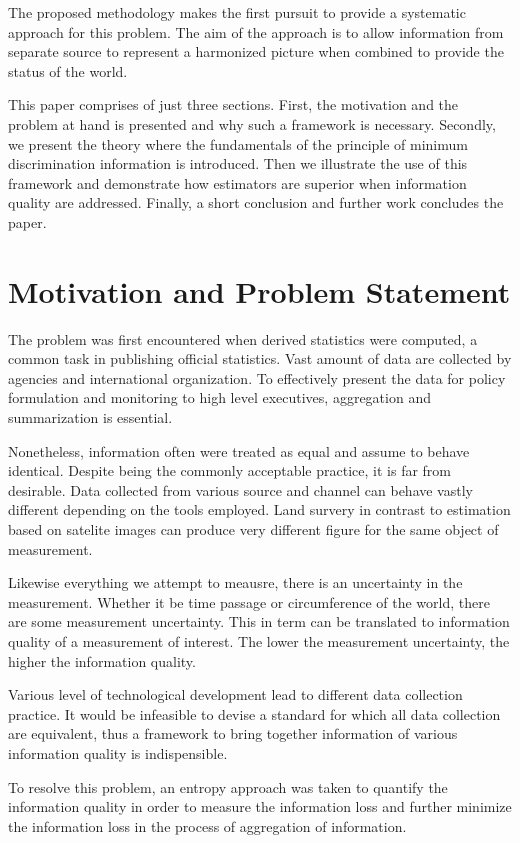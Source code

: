 \documentclass[nojss]{jss}
\begin{document}
The proposed methodology makes the first pursuit to provide a
systematic approach for this problem. The aim of the approach is to
allow information from separate source to represent a harmonized
picture when combined to provide the status of the world.

This paper comprises of just three sections. First, the motivation and
the problem at hand is presented and why such a framework is
necessary. Secondly, we present the theory where the fundamentals of
the principle of minimum discrimination information is
introduced. Then we illustrate the use of this framework and
demonstrate how estimators are superior when information quality are
addressed. Finally, a short conclusion and further work concludes the
paper.

\section{Motivation and Problem Statement}


The problem was first encountered when derived statistics were
computed, a common task in publishing official statistics. Vast amount
of data are collected by agencies and international organization. To
effectively present the data for policy formulation and monitoring to
high level executives, aggregation and summarization is essential.


Nonetheless, information often were treated as equal and assume to
behave identical. Despite being the commonly acceptable practice, it
is far from desirable. Data collected from various source and channel
can behave vastly different depending on the tools employed. Land
survery in contrast to estimation based on satelite images can produce
very different figure for the same object of measurement.

Likewise everything we attempt to meausre, there is an uncertainty in
the measurement. Whether it be time passage or circumference of the
world, there are some measurement uncertainty. This in term can be
translated to information quality of a measurement of interest. The
lower the measurement uncertainty, the higher the information
quality.

Various level of technological development lead to different data
collection practice. It would be infeasible to devise a standard for
which all data collection are equivalent, thus a framework to bring
together information of various information quality is indispensible.

To resolve this problem, an entropy approach was taken to quantify the
information quality in order to measure the information loss and
further minimize the information loss in the process of aggregation of
information.
\end{document}
